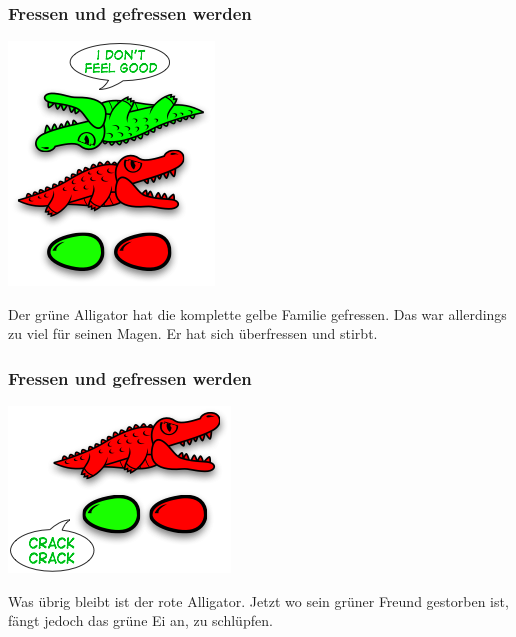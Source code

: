 \documentclass{beamer}
\begin{document}

\begin{frame}
\begin{multicols}{2}
\frametitle{Fressen und gefressen werden}

\begin{center}
\includegraphics[scale=0.45]{eating_4.png} 
\end{center}
\columnbreak

Der grüne Alligator hat die komplette gelbe Familie gefressen. Das war allerdings zu viel für seinen Magen. Er hat sich überfressen und stirbt.

\end{multicols}
\end{frame}


\begin{frame}
\begin{multicols}{2}
\frametitle{Fressen und gefressen werden}

\begin{center}
\includegraphics[scale=0.45]{eating_5.png} 
\end{center}
\columnbreak

Was übrig bleibt ist der rote Alligator. Jetzt wo sein grüner Freund gestorben ist, fängt jedoch das grüne Ei an, zu schlüpfen.

\end{multicols}
\end{frame}
\end{document}
